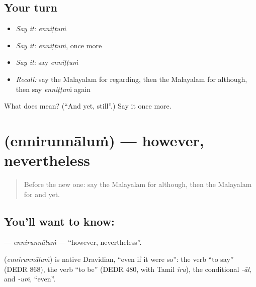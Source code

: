 \subsection*{Your turn}
\begin{itemize}
\raggedright
  \item \emph{Say it:} \emph{enniṭṭuṁ}
  \item \emph{Say it:} \emph{enniṭṭuṁ}, once more
  \item \emph{Say it:} say \emph{enniṭṭuṁ}
  \item \emph{Recall:} say the Malayalam for regarding, then the Malayalam for although, then say \emph{enniṭṭuṁ} again
\end{itemize}

\begin{tcolorbox}[breakable,colback=teal!4,colframe=teal!35!black,title={Before you move on}]
What does  mean? (\textquotedblleft{}And yet, still\textquotedblright{}.) Say it once more.
\end{tcolorbox}
\section[\texorpdfstring{\ml{എന്നിരുന്നാലും} (ennirunnāluṁ)}{എന്നിരുന്നാലും (ennirunnāluṁ)}]{ (ennirunnāluṁ) — however, nevertheless}

\label{lesson:ML-C241-ennirunnalum}



\begin{quote}
Before the new one: say the Malayalam for although, then the Malayalam for and yet.
\end{quote}

\subsection*{You'll want to know: }
\textbf{} — \emph{ennirunnāluṁ} — \textquotedblleft{}however, nevertheless\textquotedblright{}.

\begin{cousinweb}
\textbf{} (\emph{ennirunnāluṁ}) is native Dravidian, \textquotedblleft{}even if it were so\textquotedblright{}: the verb \textquotedblleft{}to say\textquotedblright{} (DEDR 868), the verb \textquotedblleft{}to be\textquotedblright{} (DEDR 480, with Tamil \emph{iru}), the conditional \emph{-āl}, and \emph{-uṁ}, \textquotedblleft{}even\textquotedblright{}.
\end{cousinweb}

